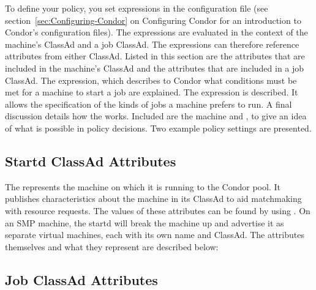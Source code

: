 To define your policy, you set expressions in
the configuration file (see section~\ref{sec:Configuring-Condor} on
Configuring Condor for an introduction to Condor's
configuration files).
The expressions are evaluated in the context of the machine's ClassAd
and a job ClassAd.
The expressions can therefore reference attributes from either
ClassAd. 
Listed in this section are
the attributes that are included in the machine's ClassAd and
the attributes that are included in a job ClassAd. 
The  expression, which describes
to Condor what conditions must be met for a machine to start a job
are explained.
The  expression is described.
It allows the specification of
the kinds of jobs a machine prefers to run.
A final discussion details how the  works.
Included are
the machine  and , to give
an idea of what is possible in policy decisions.
Two example policy settings are presented.

\subsection{\label{sec:Startd-Attributes}
Startd ClassAd Attributes}

The  represents the machine on which it is running to
the Condor pool.  It publishes characteristics about the
machine in its ClassAd to aid matchmaking with resource requests.
The values of these attributes can be found by using
.
On an SMP machine, the startd will break the machine up and advertise
it as separate virtual machines, each with its own name and ClassAd.
The attributes themselves and what they represent are described below:



\subsection{\label{sec:Job-Attributes}
Job ClassAd Attributes}




